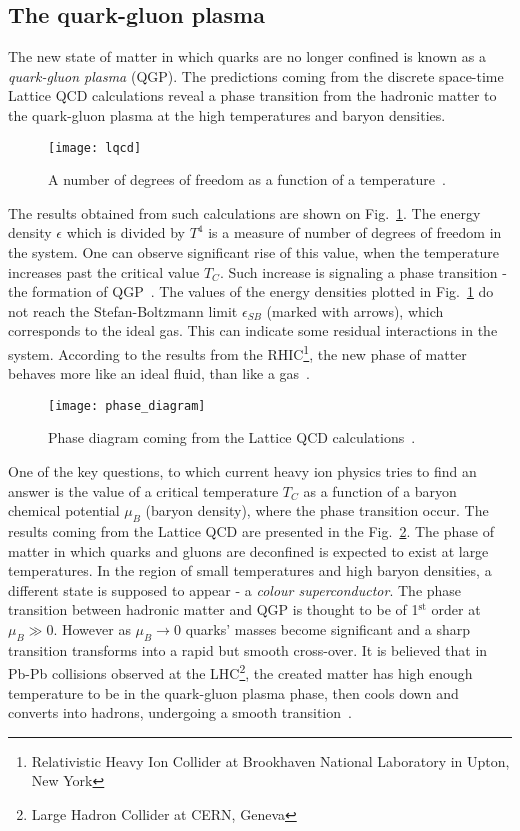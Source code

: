     \subsection{The quark-gluon plasma}
      The new state of matter in which quarks are no longer confined is known as a \textit{quark-gluon plasma} (QGP).
      The predictions coming from the discrete space-time Lattice QCD calculations reveal a phase transition from the hadronic matter to the quark-gluon plasma at the high temperatures and baryon densities.
      \begin{figure}[h]
        \centering
        \texttt{[image: lqcd]}
        \caption{A number of degrees of freedom as a function of a temperature~\cite{karsch}.}
        \label{fig:lqcd}
      \end{figure}
      The results obtained from such calculations are shown on Fig.~\ref{fig:lqcd}.
      The energy density $\epsilon$ which is divided by $T^4$ is a measure of number of degrees of freedom in the system.
      One can observe significant rise of this value, when the temperature increases past the critical value $T_C$.
      Such increase is signaling a phase transition - the formation of QGP~\cite{drkisiel}.
      The values of the energy densities plotted in Fig.~\ref{fig:lqcd} do not reach the Stefan-Boltzmann limit $\epsilon_{SB}$ (marked with arrows), which corresponds to the ideal gas.
      This can indicate some residual interactions in the system.
      According to the results from the RHIC\footnote{Relativistic Heavy Ion Collider at Brookhaven National Laboratory in Upton, New York}, the new phase of matter behaves more like an ideal fluid, than like a gas~\cite{bartke}.
      \begin{figure}[h]
        \centering
        \texttt{[image: phase\_diagram]}
        \caption{Phase diagram coming from the Lattice QCD calculations~\cite{drkisiel}.}
        \label{fig:phase_diagram}
      \end{figure}

      One of the key questions, to which current heavy ion physics tries to find an answer is the value of a critical temperature $T_C$ as a function of a baryon chemical potential $\mu_B$ (baryon density), where the phase transition occur.
      The results coming from the Lattice QCD are presented in the Fig.~\ref{fig:phase_diagram}.
      The phase of matter in which quarks and gluons are deconfined is expected to exist at large temperatures.
      In the region of small temperatures and high baryon densities, a different state is supposed to appear - a \textit{colour superconductor}.
      The phase transition between hadronic matter and QGP is thought to be of 1$^\text{st}$ order at $\mu_B \gg 0$.
      However as $\mu_B \to 0$ quarks' masses become significant and a sharp transition transforms into a rapid but smooth cross-over.
      It is believed that in Pb-Pb collisions observed at the LHC\footnote{Large Hadron Collider at CERN, Geneva}, the created matter has high enough temperature to be in the quark-gluon plasma phase, then cools down and converts into hadrons, undergoing a smooth transition~\cite{drkisiel}.
